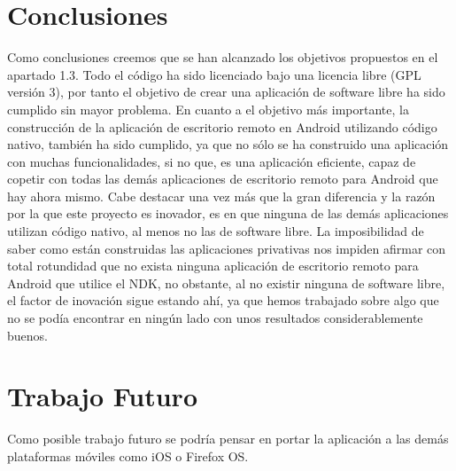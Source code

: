 \section{Conclusiones}
Como conclusiones creemos que se han alcanzado los objetivos propuestos en el apartado 1.3. Todo el código ha sido licenciado bajo una licencia libre (GPL versión 3), por tanto el objetivo de crear una aplicación de software libre ha sido cumplido sin mayor problema. En cuanto a el objetivo más importante, la construcción de la aplicación de escritorio remoto en Android utilizando código nativo, también ha sido cumplido, ya que no sólo se ha construido una aplicación con muchas funcionalidades, si no que, es una aplicación eficiente, capaz de copetir con todas las demás aplicaciones de escritorio remoto para Android que hay ahora mismo. Cabe destacar una vez más que la gran diferencia y la razón por la que este proyecto es inovador, es en que ninguna de las demás aplicaciones utilizan código nativo, al menos no las de software libre. La imposibilidad de saber como están construidas las aplicaciones privativas nos impiden afirmar con total rotundidad que no exista ninguna aplicación de escritorio remoto para Android que utilice el NDK, no obstante, al no existir ninguna de software libre, el factor de inovación sigue estando ahí, ya que hemos trabajado sobre algo que no se podía encontrar en ningún lado con unos resultados considerablemente buenos.

\section{Trabajo Futuro}

Como posible trabajo futuro se podría pensar en portar la aplicación a las demás plataformas móviles como iOS o Firefox OS. 

